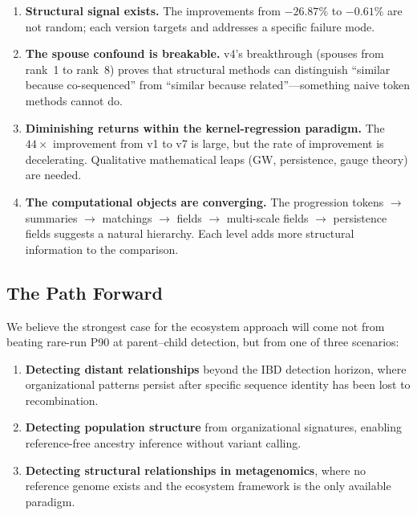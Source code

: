 \documentclass{../yalumba}
\begin{document}
\begin{enumerate}
  \item \textbf{Structural signal exists.}  The improvements from
    $-26.87\%$ to $-0.61\%$ are not random; each version targets and
    addresses a specific failure mode.

  \item \textbf{The spouse confound is breakable.}  v4's breakthrough
    (spouses from rank~1 to rank~8) proves that structural methods can
    distinguish ``similar because co-sequenced'' from ``similar because
    related''---something naive token methods cannot do.

  \item \textbf{Diminishing returns within the kernel-regression
    paradigm.}  The $44\times$ improvement from v1 to v7 is large,
    but the rate of improvement is decelerating.  Qualitative
    mathematical leaps (GW, persistence, gauge theory) are needed.

  \item \textbf{The computational objects are converging.}  The
    progression tokens $\to$ summaries $\to$ matchings $\to$ fields
    $\to$ multi-scale fields $\to$ persistence fields suggests a
    natural hierarchy.  Each level adds more structural information
    to the comparison.
\end{enumerate}

\subsection{The Path Forward}

We believe the strongest case for the ecosystem approach will come
not from beating rare-run P90 at parent--child detection, but from
one of three scenarios:

\begin{enumerate}
  \item \textbf{Detecting distant relationships} beyond the IBD
    detection horizon, where organizational patterns persist after
    specific sequence identity has been lost to recombination.

  \item \textbf{Detecting population structure} from organizational
    signatures, enabling reference-free ancestry inference without
    variant calling.

  \item \textbf{Detecting structural relationships in metagenomics},
    where no reference genome exists and the ecosystem framework
    is the only available paradigm.
\end{enumerate}
\end{document}
